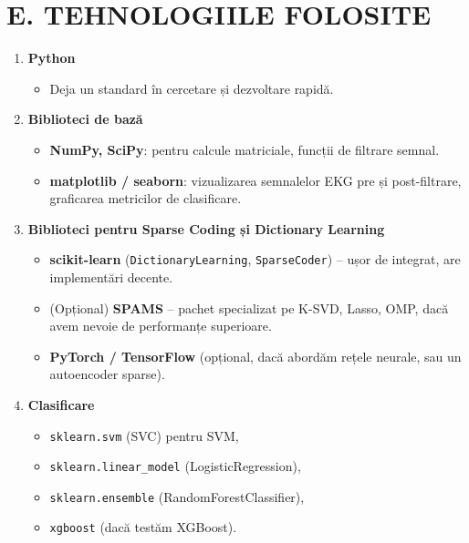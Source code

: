 \documentclass[12pt]{article}
\begin{document}
\section{E. TEHNOLOGIILE FOLOSITE}

\begin{enumerate}[label=(\arabic*)]
    \item \textbf{Python}
    \begin{itemize}
        \item Deja un standard în cercetare și dezvoltare rapidă.
    \end{itemize}

    \item \textbf{Biblioteci de bază}
    \begin{itemize}
        \item \textbf{NumPy, SciPy}: pentru calcule matriciale, funcții de filtrare semnal.
        \item \textbf{matplotlib / seaborn}: vizualizarea semnalelor EKG pre și post-filtrare, graficarea metricilor de clasificare.
    \end{itemize}

    \item \textbf{Biblioteci pentru Sparse Coding și Dictionary Learning}
    \begin{itemize}
        \item \textbf{scikit-learn} (\texttt{DictionaryLearning}, \texttt{SparseCoder}) -- ușor de integrat, are implementări decente.
        \item (Opțional) \textbf{SPAMS} -- pachet specializat pe K-SVD, Lasso, OMP, dacă avem nevoie de performanțe superioare.
        \item \textbf{PyTorch / TensorFlow} (opțional, dacă abordăm rețele neurale, sau un autoencoder sparse).
    \end{itemize}

    \item \textbf{Clasificare}
    \begin{itemize}
        \item \texttt{sklearn.svm} (SVC) pentru SVM,
        \item \texttt{sklearn.linear\_model} (LogisticRegression),
        \item \texttt{sklearn.ensemble} (RandomForestClassifier),
        \item \texttt{xgboost} (dacă testăm XGBoost).
    \end{itemize}
\end{enumerate}
\end{document}
